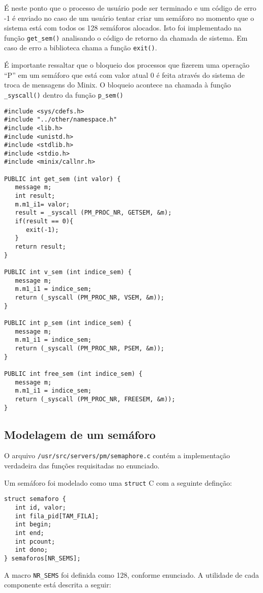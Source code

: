 \documentclass[brazil, a4paper]{scrartcl}
\begin{document}
É neste ponto que o processo de usuário pode ser terminado e um código de erro
-1 é enviado no caso de um usuário tentar criar um semáforo no momento que o
sistema está com todos os 128 semáforos alocados. Isto foi implementado
na função \texttt{get\_sem()} analisando o código de retorno da chamada de sistema.
Em caso de erro a biblioteca chama a função \texttt{exit()}.

É importante ressaltar que o bloqueio dos processos que fizerem uma operação
``P'' em um semáforo que está com valor atual 0 é feita através do sistema de
troca de mensagens do Minix. O bloqueio acontece na chamada à função
\texttt{\_syscall()} dentro da função  \texttt{p\_sem()} 

\begin{lstlisting}[style=customc]
#include <sys/cdefs.h>
#include "../other/namespace.h"
#include <lib.h>
#include <unistd.h>
#include <stdlib.h>
#include <stdio.h>
#include <minix/callnr.h>

PUBLIC int get_sem (int valor) {
   message m;
   int result;
   m.m1_i1= valor;
   result = _syscall (PM_PROC_NR, GETSEM, &m);
   if(result == 0){
      exit(-1);
   }
   return result;
}

PUBLIC int v_sem (int indice_sem) {
   message m;
   m.m1_i1 = indice_sem;
   return (_syscall (PM_PROC_NR, VSEM, &m));
}

PUBLIC int p_sem (int indice_sem) {
   message m;
   m.m1_i1 = indice_sem;
   return (_syscall (PM_PROC_NR, PSEM, &m));
}

PUBLIC int free_sem (int indice_sem) {
   message m;
   m.m1_i1 = indice_sem;
   return (_syscall (PM_PROC_NR, FREESEM, &m));
}
\end{lstlisting}

\subsection{Modelagem de um semáforo}
O arquivo \texttt{/usr/src/servers/pm/semaphore.c} contém a implementação
verdadeira das funções requisitadas no enunciado.

Um semáforo foi modelado como uma \texttt{struct} C com a seguinte definção:
\begin{lstlisting}[style=customc]
struct semaforo {
   int id, valor; 
   int fila_pid[TAM_FILA]; 
   int begin;
   int end; 
   int pcount;
   int dono;
} semaforos[NR_SEMS];
\end{lstlisting}

A macro \texttt{NR\_SEMS} foi definida como 128, conforme enunciado.
A utilidade de cada componente está descrita a seguir:
\end{document}
